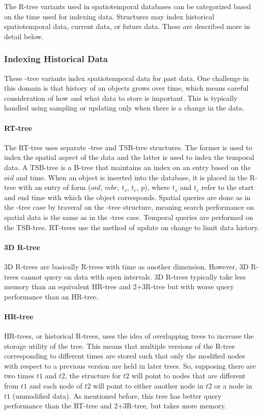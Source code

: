 The R-tree variants used in spatiotemporal databases can be categorized based
on the time used for indexing data. Structures may index historical 
spatiotemporal data, current data, or future data. These are described more
in detail below.

\subsubsection{Indexing Historical Data}
These \rbase-tree variants index spatiotemporal data for past data. One challenge
in this domain is that history of an objects grows over time, which means 
careful consideration of how and what data to store is important. This is 
typically handled using sampling or updating only when there is a change in the
data. 

\paragraph{RT-tree} The RT-tree\cite{xu1990rt} uses separate \rbase-tree and 
TSB-tree structures. The former is used 
to index the spatial aspect of the data and the latter is used to index
the temporal data. A TSB-tree is a B-tree that maintains an index on an 
entry based on the $oid$ and time. When an object is inserted into the 
database, it is placed in the R-tree with an entry of form 
($oid$, $mbr$, $t_s$, $t_e$, $p$), where $t_s$ and $t_e$ refer to the 
start and end time with which the object corresponds. Spatial queries 
are done as in the \rbase-tree case by traveral on the \rbase-tree 
structure, meaning search performance on spatial data is the same as in 
the \rbase-tree case. Temporal queries are performed on the TSB-tree. 
RT-trees use the method of update on change to limit data history.

\paragraph{3D R-tree} 3D R-trees \cite{nascimento1999evaluation} are basically
R-trees with time as another dimension. However, 3D R-trees cannot 
query on data with open intervals. 3D R-trees typically take less
memory than an equivalent HR-tree and 2+3R-tree but with worse query 
performance than an HR-tree.

\paragraph{HR-tree} HR-trees, or historical R-trees, 
\cite{nascimento1999evaluation} uses the idea of overlapping trees to 
increase the storage utility of the tree. This means that multiple 
versions of the R-tree corresponding to different times are stored such 
that only the modified nodes with respect to a previous version are 
held in later trees. So, supposing there are two times $t1$ and $t2$, the
structure for $t2$ will point to nodes that are different from $t1$ and
each node of $t2$ will point to either another node in $t2$ or a node in
$t1$ (unmodified data). As mentioned before, this tree has better query
performance than the RT-tree and 2+3R-tree, but takes more memory.

